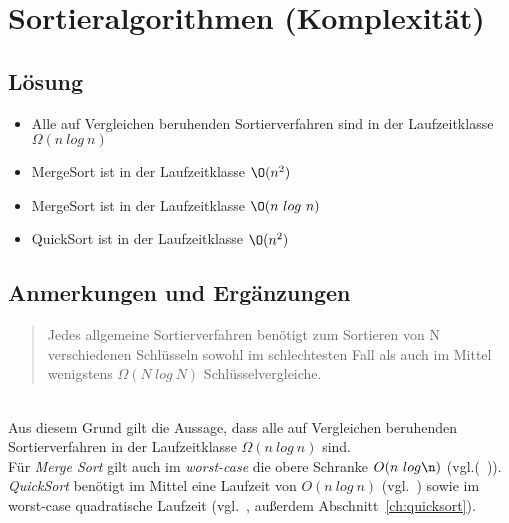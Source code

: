 \chapter{Sortieralgorithmen (Komplexität)}

\section*{Lösung}

\begin{itemize}
    \item Alle auf Vergleichen beruhenden Sortierverfahren sind in der Laufzeitklasse $\Omega(n\ log\ n)$
    \item MergeSort ist in der Laufzeitklasse $\O(n^2)$
    \item MergeSort ist in der Laufzeitklasse $\O(n\ log\ n)$
    \item QuickSort ist in der Laufzeitklasse $\O(n^2)$
\end{itemize}


\section*{Anmerkungen und Ergänzungen}

\blockquote[{\cite[154, Satz 2.4]{OW17b}}]{
    Jedes allgemeine Sortierverfahren benötigt zum Sortieren von N verschiedenen Schlüsseln sowohl im schlechtesten Fall als auch im Mittel wenigstens $\Omega(N\ log\ N)$
    Schlüsselvergleiche.
}\\

Aus diesem Grund gilt die Aussage, dass alle auf Vergleichen beruhenden Sortierverfahren in der Laufzeitklasse $\Omega(n\ log\ n)$ sind.\\

Für \textit{Merge Sort} gilt auch im \textit{worst-case} die obere Schranke $O(n\ log \n)$ (vgl.(~\cite[116]{OW17b})).\\

\textit{QuickSort} benötigt im Mittel eine Laufzeit von $O(n\ log\ n)$ (vgl.~\cite[99]{OW17b}) sowie im worst-case quadratische Laufzeit (vgl.~\cite[96]{OW17b}, außerdem Abschnitt~\ref{ch:quicksort}).